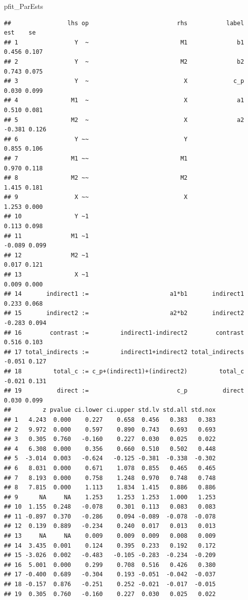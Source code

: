 \documentclass[
  11pt,
]{book}
\newenvironment{Shaded}{\begin{snugshade}}{\end{snugshade}}
\newcommand{\NormalTok}[1]{#1}
\begin{document}
\begin{Shaded}
\begin{Highlighting}[]
\NormalTok{pfit\_ParEsts}
\end{Highlighting}
\end{Shaded}

\begin{verbatim}
##                lhs op                         rhs           label    est    se
## 1                Y  ~                          M1              b1  0.456 0.107
## 2                Y  ~                          M2              b2  0.743 0.075
## 3                Y  ~                           X             c_p  0.030 0.099
## 4               M1  ~                           X              a1  0.510 0.081
## 5               M2  ~                           X              a2 -0.381 0.126
## 6                Y ~~                           Y                  0.855 0.106
## 7               M1 ~~                          M1                  0.970 0.118
## 8               M2 ~~                          M2                  1.415 0.181
## 9                X ~~                           X                  1.253 0.000
## 10               Y ~1                                              0.113 0.098
## 11              M1 ~1                                             -0.089 0.099
## 12              M2 ~1                                              0.017 0.121
## 13               X ~1                                              0.009 0.000
## 14       indirect1 :=                       a1*b1       indirect1  0.233 0.068
## 15       indirect2 :=                       a2*b2       indirect2 -0.283 0.094
## 16        contrast :=         indirect1-indirect2        contrast  0.516 0.103
## 17 total_indirects :=         indirect1+indirect2 total_indirects -0.051 0.127
## 18         total_c := c_p+(indirect1)+(indirect2)         total_c -0.021 0.131
## 19          direct :=                         c_p          direct  0.030 0.099
##         z pvalue ci.lower ci.upper std.lv std.all std.nox
## 1   4.243  0.000    0.227    0.658  0.456   0.383   0.383
## 2   9.972  0.000    0.597    0.890  0.743   0.693   0.693
## 3   0.305  0.760   -0.160    0.227  0.030   0.025   0.022
## 4   6.308  0.000    0.356    0.660  0.510   0.502   0.448
## 5  -3.014  0.003   -0.624   -0.125 -0.381  -0.338  -0.302
## 6   8.031  0.000    0.671    1.078  0.855   0.465   0.465
## 7   8.193  0.000    0.758    1.248  0.970   0.748   0.748
## 8   7.815  0.000    1.113    1.834  1.415   0.886   0.886
## 9      NA     NA    1.253    1.253  1.253   1.000   1.253
## 10  1.155  0.248   -0.078    0.301  0.113   0.083   0.083
## 11 -0.897  0.370   -0.286    0.094 -0.089  -0.078  -0.078
## 12  0.139  0.889   -0.234    0.240  0.017   0.013   0.013
## 13     NA     NA    0.009    0.009  0.009   0.008   0.009
## 14  3.435  0.001    0.124    0.395  0.233   0.192   0.172
## 15 -3.026  0.002   -0.483   -0.105 -0.283  -0.234  -0.209
## 16  5.001  0.000    0.299    0.708  0.516   0.426   0.380
## 17 -0.400  0.689   -0.304    0.193 -0.051  -0.042  -0.037
## 18 -0.157  0.876   -0.251    0.252 -0.021  -0.017  -0.015
## 19  0.305  0.760   -0.160    0.227  0.030   0.025   0.022
\end{verbatim}
\end{document}
